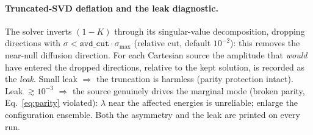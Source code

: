 \documentclass[11pt]{article}
\begin{document}
\paragraph{Truncated-SVD deflation and the leak diagnostic.}
The solver inverts $(1-K)$ through its singular-value decomposition,
dropping directions with $\sigma<\texttt{svd\_cut}\cdot\sigma_{\max}$
(relative cut, default $10^{-2}$): this removes the near-null diffusion
direction.  For each Cartesian source the amplitude that \emph{would}
have entered the dropped directions, relative to the kept solution, is
recorded as the \emph{leak}.  Small leak $\Rightarrow$ the truncation is
harmless (parity protection intact).  Leak $\gtrsim10^{-3}$
$\Rightarrow$ the source genuinely drives the marginal mode (broken
parity, Eq.~\eqref{eq:parity} violated): $\lambda$ near the affected
energies is unreliable; enlarge the configuration ensemble.  Both the
asymmetry and the leak are printed on every run.
\end{document}
